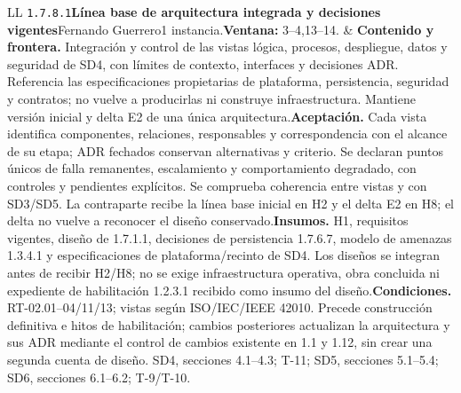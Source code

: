 \begin{longtable}{L{\tabcolsep\relax}L{\tabcolsep\relax}}
\texttt{1.\allowbreak{}7.\allowbreak{}8.\allowbreak{}1}\newline{}\textbf{Línea base de arquitectura integrada y decisiones vigentes}\newline{}Fernando Guerrero\newline{}1 instancia.\newline{}\textbf{Ventana:} 3--4,13--14. & \textbf{Contenido y frontera.} Integración y control de las vistas lógica, procesos, despliegue, datos y seguridad de SD4, con límites de contexto, interfaces y decisiones ADR. Referencia las especificaciones propietarias de plataforma, persistencia, seguridad y contratos; no vuelve a producirlas ni construye infraestructura. Mantiene versión inicial y delta E2 de una única arquitectura.\newline{}\textbf{Aceptación.} Cada vista identifica componentes, relaciones, responsables y correspondencia con el alcance de su etapa; ADR fechados conservan alternativas y criterio. Se declaran puntos únicos de falla remanentes, escalamiento y comportamiento degradado, con controles y pendientes explícitos. Se comprueba coherencia entre vistas y con SD3/SD5. La contraparte recibe la línea base inicial en H2 y el delta E2 en H8; el delta no vuelve a reconocer el diseño conservado.\newline{}\textbf{Insumos.} H1, requisitos vigentes, diseño de 1.7.1.1, decisiones de persistencia 1.7.6.7, modelo de amenazas 1.3.4.1 y especificaciones de plataforma/recinto de SD4. Los diseños se integran antes de recibir H2/H8; no se exige infraestructura operativa, obra concluida ni expediente de habilitación 1.2.3.1 recibido como insumo del diseño.\newline{}\textbf{Condiciones.} RT-02.01--04/11/13; vistas según ISO/IEC/IEEE 42010. Precede construcción definitiva e hitos de habilitación; cambios posteriores actualizan la arquitectura y sus ADR mediante el control de cambios existente en 1.1 y 1.12, sin crear una segunda cuenta de diseño. SD4, secciones 4.1--4.3; T-11; SD5, secciones 5.1--5.4; SD6, secciones 6.1--6.2; T-9/T-10.\\\hline
\end{longtable}\endgroup
\begingroup\setlength{\tabcolsep}{3pt}
